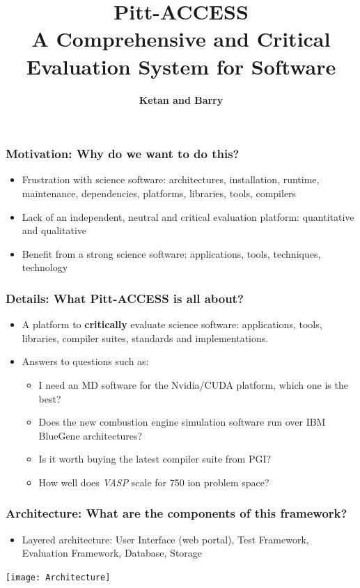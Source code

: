 \documentclass[hyperref={pdfpagelabels=false},12pt]{beamer}
\title[Pitt Access]{{\large Pitt-ACCESS\\ A Comprehensive and Critical Evaluation System for Software}}
\author[Pitt-Access]{{\scriptsize \textbf{Ketan and Barry}}}
\date{}
\begin{document}
\begin{frame}[plain]
\titlepage
\end{frame}

\begin{frame}
\frametitle{Motivation: Why do we want to do this?}
\begin{itemize}
\itemsep1em
\item 
Frustration with science software: architectures, installation, runtime, maintenance, dependencies, platforms, libraries, tools, compilers
\item 
Lack of an independent, neutral and critical evaluation platform: quantitative and qualitative
\item 
Benefit from a strong science software: applications, tools, techniques, technology
\end{itemize}
\end{frame}

\begin{frame}
\frametitle{Details: What Pitt-ACCESS is all about?}
\begin{itemize}
\itemsep1em
\item 
A platform to \textbf{critically} evaluate science software: applications, tools, libraries, compiler suites, standards and implementations.
\item 
Answers to questions such as:
\begin{itemize}
\item 
I need an MD software for the Nvidia/CUDA platform, which one is the best?
\item 
Does the new combustion engine simulation software run over IBM BlueGene architectures?
\item 
Is it worth buying the latest compiler suite from PGI?
\item 
How well does \textit{VASP} scale for 750 ion problem space?
\end{itemize}
\end{itemize}

\end{frame}

\begin{frame}
\frametitle{Architecture: What are the components of this framework?}
\begin{itemize}
\item 
Layered architecture: User Interface (web portal), Test Framework, Evaluation Framework, Database, Storage
\end{itemize}
\texttt{[image: Architecture]}
\end{frame}
\end{document}
